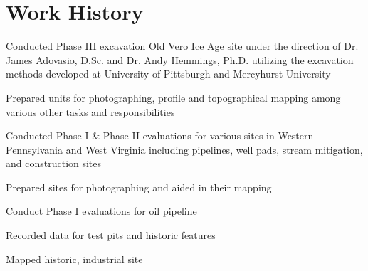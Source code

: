 \documentclass[letterpaper]{resume}
\begin{document}
\section{Work History}

\begin{compactitem}
\item Conducted Phase III excavation Old Vero Ice Age site under the direction of Dr. James Adovasio, D.Sc. and Dr. Andy Hemmings, Ph.D. utilizing the excavation methods developed at University of Pittsburgh and Mercyhurst University
\item Prepared units for photographing, profile and topographical mapping among various other tasks and responsibilities
\end{compactitem}

\begin{compactitem}
\item Conducted Phase I \& Phase II evaluations for various sites in Western Pennsylvania and West Virginia including pipelines, well pads, stream mitigation, and construction sites
\item Prepared sites for photographing and aided in their mapping
\end{compactitem}

\begin{compactitem}
\item Conduct Phase I evaluations for oil pipeline
\item Recorded data for test pits and historic features
\item Mapped historic, industrial site
\end{compactitem}
\end{document}
